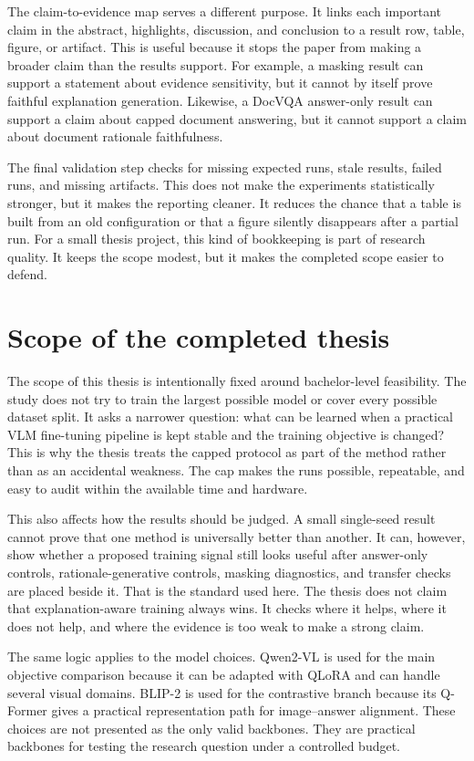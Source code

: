 \documentclass[12pt,bibliography=totoc,listof=totoc,BCOR=5mm,DIV=12,oneside,open=any]{scrbook}
\begin{document}
The claim-to-evidence map serves a different purpose.
It links each important claim in the abstract, highlights, discussion, and conclusion to a result row, table, figure, or artifact.
This is useful because it stops the paper from making a broader claim than the results support.
For example, a masking result can support a statement about evidence sensitivity, but it cannot by itself prove faithful explanation generation.
Likewise, a DocVQA answer-only result can support a claim about capped document answering, but it cannot support a claim about document rationale faithfulness.

The final validation step checks for missing expected runs, stale results, failed runs, and missing artifacts.
This does not make the experiments statistically stronger, but it makes the reporting cleaner.
It reduces the chance that a table is built from an old configuration or that a figure silently disappears after a partial run.
For a small thesis project, this kind of bookkeeping is part of research quality.
It keeps the scope modest, but it makes the completed scope easier to defend.

\section{Scope of the completed thesis}
The scope of this thesis is intentionally fixed around bachelor-level feasibility.
The study does not try to train the largest possible model or cover every possible dataset split.
It asks a narrower question: what can be learned when a practical VLM fine-tuning pipeline is kept stable and the training objective is changed?
This is why the thesis treats the capped protocol as part of the method rather than as an accidental weakness.
The cap makes the runs possible, repeatable, and easy to audit within the available time and hardware.

This also affects how the results should be judged.
A small single-seed result cannot prove that one method is universally better than another.
It can, however, show whether a proposed training signal still looks useful after answer-only controls, rationale-generative controls, masking diagnostics, and transfer checks are placed beside it.
That is the standard used here.
The thesis does not claim that explanation-aware training always wins.
It checks where it helps, where it does not help, and where the evidence is too weak to make a strong claim.

The same logic applies to the model choices.
Qwen2-VL is used for the main objective comparison because it can be adapted with QLoRA and can handle several visual domains.
BLIP-2 is used for the contrastive branch because its Q-Former gives a practical representation path for image--answer alignment.
These choices are not presented as the only valid backbones.
They are practical backbones for testing the research question under a controlled budget.
\end{document}
